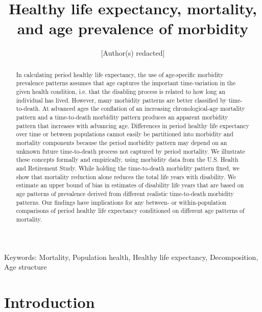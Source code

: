 \documentclass[12pt,oneside,letterpaper,doublespacing]{article}  %
\begin{document}
\title{Healthy life expectancy, mortality, and age prevalence of morbidity}

\author{[Author(s) redacted]}


\maketitle

\pagebreak %


\begin{abstract}
In calculating period healthy life expectancy, the use of age-specific
morbidity prevalence patterns assumes that age captures the important
time-variation in the given health condition, i.e. that the disabling process is related to how long an individual has lived. However, many morbidity patterns are better classified by time-to-death. At advanced ages the conflation of an increasing chronological-age mortality pattern and a time-to-death morbidity pattern produces an apparent morbidity pattern that increases with advancing age. Differences in period healthy life expectancy over time or between populations cannot easily be partitioned into morbidity and mortality components because the period morbidity pattern may depend on an unknown future time-to-death process not captured by period mortality. We illustrate these concepts formally and empirically, using morbidity data from the U.S. Health and Retirement Study.
While holding the time-to-death morbidity pattern fixed, we show that mortality
reduction alone reduces the total life years with disability. We estimate an
upper bound of bias in estimates of disability life years that are based on age
patterns of prevalence derived from different realistic time-to-death morbidity
patterns.
Our findings have implications for any between- or within-population
comparisons of period healthy life expectancy conditioned on different age patterns of mortality.
\end{abstract}
Keywords: Mortality, Population health, Healthy life expectancy, Decomposition, Age structure
\pagebreak %

\section{Introduction}
\end{document}

